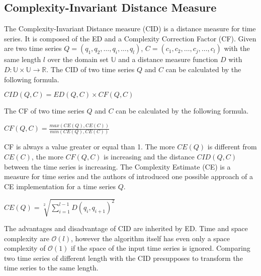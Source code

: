 \subsection{Complexity-Invariant Distance Measure} \label{complexity-invariant_distance_measure}
The Complexity-Invariant Distance measure \cite{batista2011complexity} (CID) is a distance measure for time
series. It is composed of the ED and a Complexity Correction Factor (CF). Given are two time series
$Q = (q_1, q_2, \dots, q_i, \dots, q_l)$, $C = (c_1, c_2, \dots, c_j, \dots, c_l)$ with the same length $l$ over the
domain set $\mathbb{U}$ and a distance measure function $D$ with $D: \mathbb{U} \times \mathbb{U} \to \mathbb{R}$.
The CID of two time series $Q$ and $C$ can be calculated by the following formula.
\begin{center}
    $CID(Q, C) = ED(Q, C) \times CF(Q, C)$
\end{center}
The CF of two time series $Q$ and $C$ can be calculated by the following formula.
\begin{center}
     $CF(Q, C) = \frac{max(CE(Q), CE(C))}{min(CE(Q), CE(C))}$
\end{center}
CF is always a value greater or equal than 1. The more $CE(Q)$ is different from $CE(C)$, the more $CF(Q, C)$ is
increasing and the distance $CID(Q, C)$ between the time series is increasing. The Complexity Estimate (CE) is a measure
for time series and the authors of \cite{batista2011complexity} introduced one possible approach of a CE implementation
for a time series $Q$.
\begin{center}
    $CE(Q) = \sqrt[2]{\sum \limits_{i=1}^{l-1} D(q_i, q_{i + 1})^2}$
\end{center}

The advantages and disadvantage of CID are inherited by ED. Time and space complexity are $\mathcal{O}(l)$, however the
algorithm itself has even only a space complexity of $\mathcal{O}(1)$ if the space of the input time series is ignored.
Comparing two time series of different length with the CID presupposes to transform the time series to the same length.


